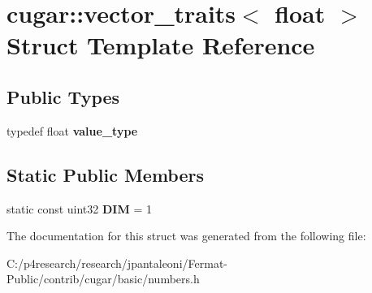 \hypertarget{structcugar_1_1vector__traits_3_01float_01_4}{}\section{cugar\+:\+:vector\+\_\+traits$<$ float $>$ Struct Template Reference}
\label{structcugar_1_1vector__traits_3_01float_01_4}
\subsection*{Public Types}
\begin{DoxyCompactItemize}
\item 
\mbox{\label{structcugar_1_1vector__traits_3_01float_01_4_af0e9f0e33ce23dc409e5b8bb4f83fb6d}} 
typedef float {\bfseries value\+\_\+type}
\end{DoxyCompactItemize}
\subsection*{Static Public Members}
\begin{DoxyCompactItemize}
\item 
\mbox{\label{structcugar_1_1vector__traits_3_01float_01_4_a86de14fb6b6855b9872b073a3860188f}} 
static const uint32 {\bfseries D\+IM} = 1
\end{DoxyCompactItemize}


The documentation for this struct was generated from the following file\+:\begin{DoxyCompactItemize}
\item 
C\+:/p4research/research/jpantaleoni/\+Fermat-\/\+Public/contrib/cugar/basic/numbers.\+h\end{DoxyCompactItemize}
